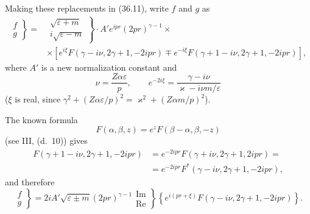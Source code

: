 Making these replacements in (36.11), write $f$ and $g$ as
\[
\begin{aligned}
\left.\begin{matrix}f\\g\end{matrix}\right\}
={}&\left.\begin{matrix}\sqrt{\varepsilon+m}\\i\sqrt{\varepsilon-m}\end{matrix}\right\}
\cdot A'e^{ipr}(2pr)^{\gamma-1}\times{}\\
&\times\left[e^{i\xi}F(\gamma-i\nu,2\gamma+1,-2ipr)
\mp e^{-i\xi}F(\gamma+1-i\nu,2\gamma+1,-2ipr)\right],
\end{aligned}
\]
where $A'$ is a new normalization constant and
\begin{equation}
\nu=\frac{Z\alpha\varepsilon}{p},
\qquad
e^{-2i\xi}=\frac{\gamma-i\nu}{\varkappa-i\nu m/\varepsilon}
\tag{36.13}
\end{equation}
($\xi$ is real, since $\gamma^2+(Z\alpha\varepsilon/p)^2
=\varkappa^2+(Z\alpha m/p)^2$).

The known formula
\[
F(\alpha,\beta,z)=e^zF(\beta-\alpha,\beta,-z)
\]
(see III, (d.~10)) gives
\[
\begin{aligned}
F(\gamma+1-i\nu,2\gamma+1,-2ipr)
&=e^{-2ipr}F(\gamma+i\nu,2\gamma+1,2ipr)={}\\
&=e^{-2ipr}F^*(\gamma-i\nu,2\gamma+1,-2ipr),
\end{aligned}
\]
and therefore
\begin{equation}
\left.\begin{matrix}f\\g\end{matrix}\right\}
=2iA'\sqrt{\varepsilon\pm m}(2pr)^{\gamma-1}
\left.\begin{matrix}\operatorname{Im}\\\operatorname{Re}\end{matrix}\right\}
\left\{e^{i(pr+\xi)}F(\gamma-i\nu,2\gamma+1,-2ipr)\right\}.
\tag{36.14}
\end{equation}

